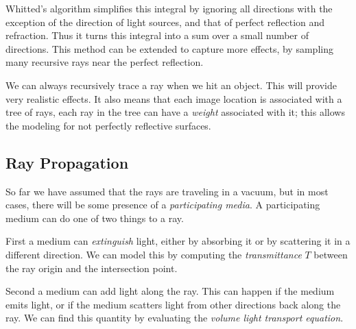 \documentclass[
]{book}
\begin{document}
Whitted's algorithm simplifies this integral by ignoring all directions with
the exception of the direction of light sources, and that of perfect
reflection and refraction. Thus it turns this integral into a sum over a small
number of directions. This method can be extended to capture more effects, by
sampling many recursive rays near the perfect reflection.

We can always recursively trace a ray when we hit an object. This will provide
very realistic effects. It also means that each image location is associated
with a tree of rays, each ray in the tree can have a \emph{weight} associated with
it; this allows the modeling for not perfectly reflective surfaces.

\hypertarget{ray-propagation}{%
\subsection{Ray Propagation}\label{ray-propagation}}

So far we have assumed that the rays are traveling in a vacuum, but in most
cases, there will be some presence of a \emph{participating media}. A participating
medium can do one of two things to a ray.

First a medium can \emph{extinguish} light, either by absorbing it or by scattering
it in a different direction. We can model this by computing the \emph{transmittance}
\(T\) between the ray origin and the intersection point.

Second a medium can add light along the ray. This can happen if the medium
emits light, or if the medium scatters light from other directions back along
the ray. We can find this quantity by evaluating the \emph{volume light transport
equation}.

\backmatter
\end{document}

